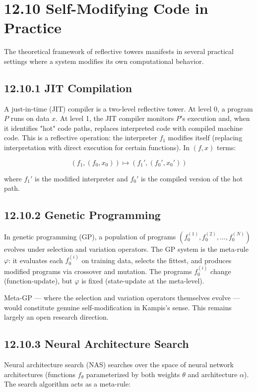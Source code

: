 \section{12.10 Self-Modifying Code in Practice}

The theoretical framework of reflective towers manifests in several practical settings where a system modifies its own computational behavior.

\subsection{12.10.1 JIT Compilation}

A just-in-time (JIT) compiler is a two-level reflective tower. At level 0, a program $P$ runs on data $x$. At level 1, the JIT compiler monitors $P$'s execution and, when it identifies "hot" code paths, replaces interpreted code with compiled machine code. This is a reflective operation: the interpreter $f_1$ modifies itself (replacing interpretation with direct execution for certain functions). In $(f, x)$ terms:

\[
(f_1, (f_0, x_0)) \longmapsto (f_1', (f_0', x_0'))
\]

where $f_1'$ is the modified interpreter and $f_0'$ is the compiled version of the hot path.

\subsection{12.10.2 Genetic Programming}

In genetic programming (GP), a population of programs $(f_0^{(1)}, f_0^{(2)}, \ldots, f_0^{(N)})$ evolves under selection and variation operators. The GP system is the meta-rule $\varphi$: it evaluates each $f_0^{(i)}$ on training data, selects the fittest, and produces modified programs via crossover and mutation. The programs $f_0^{(i)}$ change (function-update), but $\varphi$ is fixed (state-update at the meta-level).

Meta-GP --- where the selection and variation operators themselves evolve --- would constitute genuine self-modification in Kampis's sense. This remains largely an open research direction.

\subsection{12.10.3 Neural Architecture Search}

Neural architecture search (NAS) searches over the space of neural network architectures (functions $f_\theta$ parameterized by both weights $\theta$ and architecture $\alpha$). The search algorithm acts as a meta-rule:

